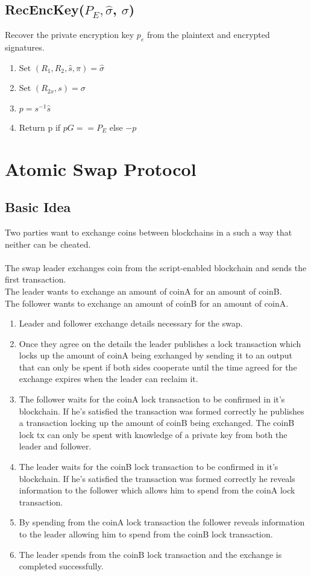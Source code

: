 \documentclass[a4paper]{article}
\begin{document}
\subsection{RecEncKey($P_{E}, \hat{\sigma}$, $\sigma$)}
Recover the private encryption key $p_{e}$ from the plaintext and encrypted signatures.
\begin{enumerate}
    \item Set $(R_{1}, R_{2}, \hat{s}, \pi) = \hat{\sigma}$
    \item Set $(R_{2x}, s) = \sigma$
    \item $p = s^{-1}\hat{s}$
    \item Return p if $pG == P_{E}$ else $-p$
\end{enumerate}


\section{Atomic Swap Protocol}

\subsection{Basic Idea}
Two parties want to exchange coins between blockchains in a such a way
that neither can be cheated.\\
\\
The swap leader exchanges coin from the script-enabled blockchain and sends the first transaction.\\
The leader wants to exchange an amount of coinA for an amount of coinB.\\
The follower wants to exchange an amount of coinB for an amount of coinA.\\


\begin{enumerate}
    \item Leader and follower exchange details necessary for the swap.
    \item Once they agree on the details the leader publishes a lock transaction
which locks up the amount of coinA being exchanged by sending it to an
output that can only be spent if both sides cooperate until the time
agreed for the exchange expires when the leader can reclaim it.
    \item The follower waits for the coinA lock transaction to be confirmed in
it's blockchain.  If he's satisfied the transaction was formed correctly
he publishes a transaction locking up the amount of coinB being
exchanged.  The coinB lock tx can only be spent with knowledge of a
private key from both the leader and follower.
    \item The leader waits for the coinB lock transaction to be confirmed in
it's blockchain. If he's satisfied the transaction was formed correctly
he reveals information to the follower which allows him to spend from
the coinA lock transaction.
    \item By spending from the coinA lock transaction the follower reveals
information to the leader allowing him to spend from the coinB lock
transaction.
    \item The leader spends from the coinB lock transaction and the exchange is
completed successfully.
\end{enumerate}
\end{document}
